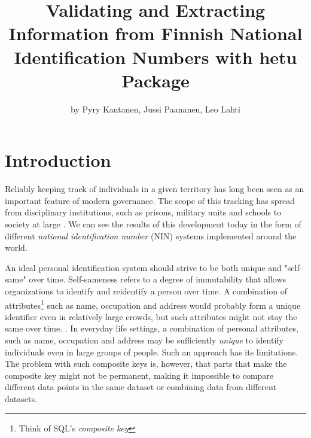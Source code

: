 \title{Validating and Extracting Information from Finnish National Identification Numbers with hetu Package}
\author{by Pyry Kantanen, Jussi Paananen, Leo Lahti} %

\maketitle


\section{Introduction}

Reliably keeping track of individuals in a given territory has long been seen as an important feature of modern governance. The scope of this tracking has spread from disciplinary institutions, such as prisons, military units and schools to society at large \citep{foucault7778}. We can see the results of this development today in the form of different \emph{national identification number} (NIN) systems implemented around the world.

An ideal personal identification system should strive to be both unique and "self-same" over time. Self-sameness refers to a degree of immutability that allows organizations to identify and reidentify a person over time. A combination of attributes\footnote{Think of SQL's \emph{composite key}} such as name, occupation and address would probably form a unique identifier even in relatively large crowds, but such attributes might not stay the same over time. \citep{brensinger2021}. In everyday life settings, a combination of personal attributes, such as name, occupation and address may be sufficiently \emph{unique} to identify individuals even in large groups of people. Such an approach has its limitations. The problem with such composite keys is, however, that parts that make the composite key might not be permanent, making it impossible to compare different data points in the same dataset or combining data from different datasets. 

